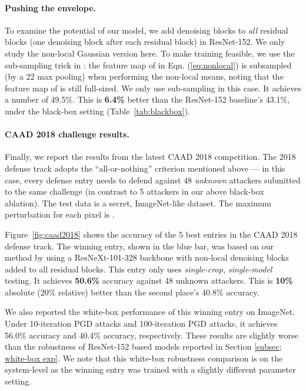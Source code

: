 \documentclass[10pt,twocolumn,letterpaper]{article}
\begin{document}
\paragraph{Pushing the envelope.} To examine the potential of our model, we add denoising blocks to \emph{all} residual blocks (one denoising block after each residual block) in ResNet-152.
We only study the non-local Gaussian version here. 
To make training feasible, we use the sub-sampling trick in \cite{Wang2018}: the feature map of  in Eqn. (\ref{eq:nonlocal}) is subsampled (by a 22 max pooling) when performing the non-local means, noting that the feature map of  is still full-sized. We only use sub-sampling in this case. It achieves a number of 49.5\%. This is \textbf{6.4\%} better than the ResNet-152 baseline's 43.1\%, under the black-box setting (Table~\ref{tab:blackbox}).

\paragraph{CAAD 2018 challenge results.} Finally, we report the results from the latest CAAD 2018 competition. The 2018 defense track adopts the ``all-or-nothing'' criterion mentioned above --- in this case, every defense entry needs to defend against 48 \emph{unknown} attackers submitted to the same challenge (in contrast to 5 attackers in our above black-box ablation). 
The test data is a secret, ImageNet-like dataset.
The maximum perturbation for each pixel is .

Figure~\ref{fig:caad2018} shows the accuracy of the 5 best entries in the CAAD 2018 defense track. The winning entry, shown in the blue bar, was based on our method by using a ResNeXt-101-328 backbone \cite{Xie2017} with non-local denoising blocks added to all residual blocks. This entry only uses \emph{single-crop, single-model} testing. It achieves \textbf{50.6\%} accuracy against 48 unknown attackers. This is \textbf{10\%} absolute (20\% relative) better than the second place's 40.8\% accuracy. 

We also reported the white-box performance of this winning entry on ImageNet. Under 10-iteration PGD attacks and 100-iteration PGD attacks, it achieves 56.0\% accuracy and 40.4\% accuracy, respectively. These results are slightly worse than the robustness of ResNet-152 based models reported in Section \ref{subsec; white-box exp}. We note that this white-box robustness comparison is on the system-level as the winning entry was trained with a slightly different parameter setting. 
\end{document}
